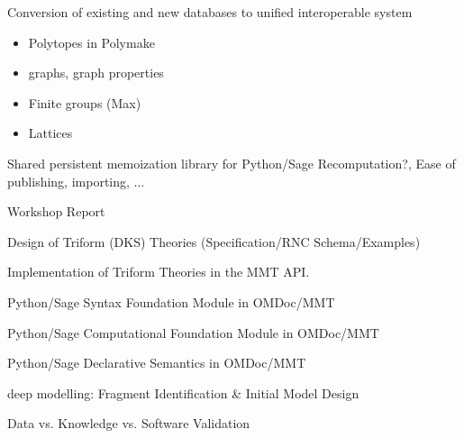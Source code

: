 \begin{workpackage}[id=dksbases,wphases=1-48!.5,
  title=Data/Knowledge/Software-Bases,
  ZHRM=1,JURM=36]
\begin{wpdelivs}
  \begin{wpdeliv}[due=12,id=conv,dissem=??,nature=??]
        {Conversion of existing and new databases to unified interoperable system}
     \begin{itemize}
     \item Polytopes in Polymake
     \item graphs, graph properties
     \item Finite groups (Max)
     \item Lattices
     \end{itemize}
   \end{wpdeliv}
  \begin{wpdeliv}[due=24,id=persistent_memoization,dissem=??,nature=??]
    {Shared persistent memoization library for Python/Sage} 
    Recomputation?,  Ease of publishing, importing, ...
  \end{wpdeliv}
  \begin{wpdeliv}[due=9,id=wsrep,dissem=??,nature=??]{Workshop Report}
  \end{wpdeliv}
  \begin{wpdeliv}[due=12,id=dkstheories,dissem=??,nature=??]
        {Design of Triform (DKS) Theories (Specification/RNC Schema/Examples)}
  \end{wpdeliv}
  \begin{wpdeliv}[due=24,id=dksimp,dissem=??,nature=??]
        {Implementation of Triform Theories in the MMT API.}
  \end{wpdeliv}
  \begin{wpdeliv}[due=12,id=pssyntax,dissem=??,nature=??]
        {Python/Sage Syntax Foundation Module in OMDoc/MMT}
  \end{wpdeliv}
  \begin{wpdeliv}[due=24,id=psfoundation,dissem=??,nature=??]
        {Python/Sage Computational Foundation Module in OMDoc/MMT}
  \end{wpdeliv}
  \begin{wpdeliv}[due=36,id=pssem,dissem=??,nature=??]
      {Python/Sage Declarative Semantics in OMDoc/MMT}
  \end{wpdeliv}
  \begin{wpdeliv}[due=12,id=lfmmod,dissem=??,nature=??]
      {\LMFDB deep modelling: Fragment Identification \& Initial Model Design}
  \end{wpdeliv}
  \begin{wpdeliv}[due=18,id=lfmval,dissem=??,nature=??]
      {\LMFDB Data vs. Knowledge vs. Software Validation}

\end{wpdeliv}
\end{wpdelivs}
\end{workpackage}
